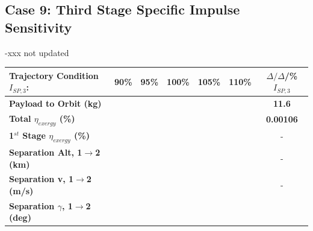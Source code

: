 \subsection{Case 9: Third Stage Specific Impulse Sensitivity}\label{sec:isp3NoReturn}
-xxx not updated
\begin{table}[ht] %

	\centering
	\begin{tabular}{l c c c c c c} 
		\hline \textbf{Trajectory Condition}   \qquad  $I_{SP,3}$:
		&90\%
		&95\%
		&100\%
		&105\%
		&110\%
		& $\Delta/\Delta$/\%$I_{SP,3}$
		\\
		\hline \textbf{Payload to Orbit (kg)}
		& \textbf{\PayloadToOrbitISPThreeNinetyNoReturn}
		& \textbf{\PayloadToOrbitISPThreeNinetyFiveNoReturn}
		& \textbf{\PayloadToOrbitISPThreeStandardNoReturn}
		& \textbf{\PayloadToOrbitISPThreeOneHundredFiveNoReturn}
		& \textbf{\PayloadToOrbitISPThreeOneHundredTenNoReturn}
		&\textbf{11.6}
		\\
		\textbf{Total $\eta_{exergy}$ (\%)}
		& \textbf{\totalExergyEffISPThreeNinetyNoReturn}
		& \textbf{\totalExergyEffISPThreeNinetyFiveNoReturn}
		& \textbf{\totalExergyEffISPThreeStandardNoReturn}
		& \textbf{\totalExergyEffISPThreeOneHundredFiveNoReturn}
		& \textbf{\totalExergyEffISPThreeOneHundredTenNoReturn}
		& \textbf{0.00106}
		\\
		\hline 
		\textbf{1$^{st}$ Stage $\eta_{exergy}$ (\%)}
		& \textbf{\firstExergyEffISPThreeNinetyNoReturn}
		& \textbf{\firstExergyEffISPThreeNinetyFiveNoReturn}
		& \textbf{\firstExergyEffISPThreeStandardNoReturn}
		& \textbf{\firstExergyEffISPThreeOneHundredFiveNoReturn}
		& \textbf{\firstExergyEffISPThreeOneHundredTenNoReturn}
		& -
		\\
		\textbf{Separation Alt, 1$\rightarrow$2 (km)}
		& \firstsecondSeparationAltISPThreeNinetyNoReturn
		& \firstsecondSeparationAltISPThreeNinetyFiveNoReturn
		& \firstsecondSeparationAltISPThreeStandardNoReturn
		& \firstsecondSeparationAltISPThreeOneHundredFiveNoReturn
		& \firstsecondSeparationAltISPThreeOneHundredTenNoReturn
		& -
		\\
		\textbf{Separation v, 1$\rightarrow$2 (m/s)}
		& \firstsecondSeparationvISPThreeNinetyNoReturn
		& \firstsecondSeparationvISPThreeNinetyFiveNoReturn
		& \firstsecondSeparationvISPThreeStandardNoReturn
		& \firstsecondSeparationvISPThreeOneHundredFiveNoReturn
		& \firstsecondSeparationvISPThreeOneHundredTenNoReturn
		& -
		\\
		\textbf{Separation $\gamma$, 1$\rightarrow$2 (deg)}
		& \firstsecondSeparationgammaISPThreeNinetyNoReturn

\end{tabular}
\end{table}
